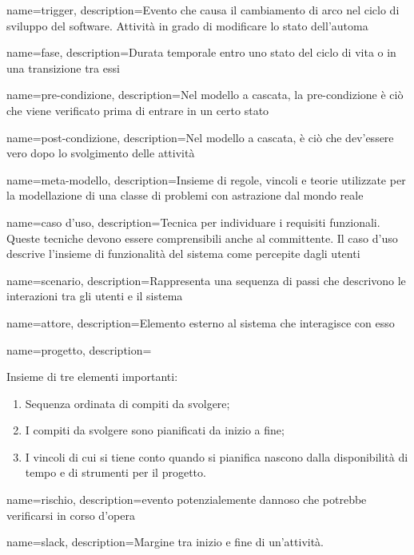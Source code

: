 {
name=trigger,
description={Evento che causa il cambiamento di arco nel ciclo di sviluppo del software. Attivit\`a in grado di modificare lo stato dell'automa}
}

{
name=fase,
description={Durata temporale entro uno stato del ciclo di vita o in una transizione tra essi}
}


{
name=pre-condizione,
description={Nel modello a cascata, la pre-condizione \`e ci\`o che viene verificato prima di entrare in un certo stato}
}

{
name=post-condizione,
description={Nel modello a cascata, \`e ci\`o che dev'essere vero dopo lo svolgimento delle attivit\`a}
}

{
name=meta-modello,
description={Insieme di regole, vincoli e teorie utilizzate per la modellazione di una classe di problemi con astrazione dal mondo reale}
}

{
name=caso d'uso,
description={Tecnica per individuare i requisiti funzionali. Queste tecniche devono essere comprensibili anche al committente. Il caso d'uso descrive l'insieme di funzionalit\`a del sistema come percepite dagli utenti}
}

{
name=scenario,
description={Rappresenta una sequenza di passi che descrivono le interazioni tra gli utenti e il sistema}
}

{
name=attore,
description={Elemento esterno al sistema che interagisce con esso}
}

{
name=progetto,
description={Insieme di tre elementi importanti: \begin{enumerate}
\item Sequenza ordinata di compiti da svolgere;
\item I compiti da svolgere sono pianificati da inizio a fine;
\item I vincoli di cui si tiene conto quando si pianifica nascono dalla disponibilità di tempo e di strumenti per il progetto.
\end{enumerate}
}
}

{
name=rischio,
description={evento potenzialemente dannoso che potrebbe verificarsi in corso d'opera}
}

{
name=slack,
description={Margine tra inizio e fine di un'attivit\`a.}
}

